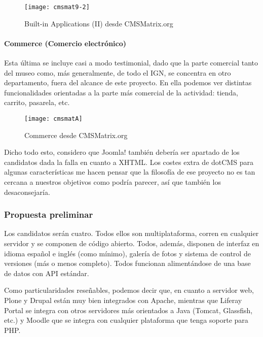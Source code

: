 \begin{figure}
\begin{narrow}{-0.12\linewidth}{-0.12\linewidth}
\centering
\texttt{[image: cmsmat9-2]}
\caption{Built-in Applications (II) desde CMSMatrix.org}
\end{narrow}
\end{figure}

\paragraph{Commerce (Comercio electrónico)}


\par Esta última se incluye casi a modo testimonial, dado que la parte comercial tanto del museo como, más generalmente, de todo el IGN, se concentra en otro departamento, fuera del alcance de este proyecto. En ella podemos ver distintas funcionalidades orientadas a la parte más comercial de la actividad: tienda, carrito, pasarela, etc.

\begin{figure}
\begin{narrow}{-0.12\linewidth}{-0.12\linewidth}
\centering
\texttt{[image: cmsmatA]}
\caption{Commerce desde CMSMatrix.org}
\end{narrow}
\label{fig:cmsmatA}
\end{figure}



\par Dicho todo esto, considero que Joomla! también debería ser apartado de los candidatos dada la falla en cuanto a XHTML. Los costes extra de dotCMS para algunas características me hacen pensar que la filosofía de ese proyecto no es tan cercana a nuestros objetivos como podría parecer, así que también los desaconsejaría.


\subsubsection{Propuesta preliminar}
\par Los candidatos serán cuatro. Todos ellos son multiplataforma, corren en cualquier servidor y se componen de código abierto. Todos, además, disponen de interfaz en idioma español e inglés (como mínimo), galería de fotos y sistema de control de versiones (más o menos completo). Todos funcionan alimentándose de una base de datos con API estándar.
\par Como particularidades reseñables, podemos decir que, en cuanto a servidor web, Plone y Drupal están muy bien integrados con Apache, mientras que Liferay Portal se integra con otros servidores más orientados a Java (Tomcat, Glassfish, etc.) y Moodle que se integra con cualquier plataforma que tenga soporte para PHP.

